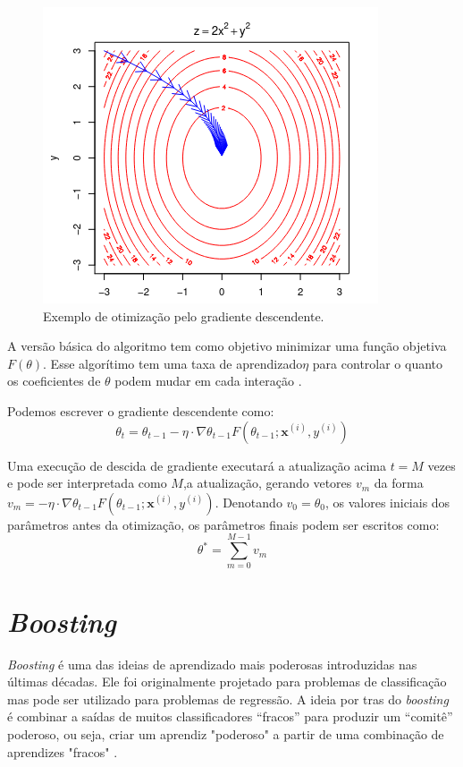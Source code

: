 \begin{figure}[h]
 \caption{Exemplo de otimização pelo gradiente descendente.}
 \label{fig:ex:grad}
 \centering
 \includegraphics[scale=0.4]{images/ilustra_grad.png}
\end{figure}

A versão básica do algoritmo tem como objetivo minimizar uma função objetiva $F(\theta)$. Esse algorítimo tem uma taxa de aprendizado$\eta$ para controlar o quanto os coeficientes de $\theta$ podem mudar em cada interação \cite{russel,hastie,ian,over:gradia,mit:parallel,convex:opt}. 

Podemos escrever o gradiente descendente como:
\begin{equation} \label{eq:gradiente}
    \theta_t = \theta_{t-1} - \eta \cdot \nabla{\theta_{t-1}}F(\theta_{t-1};\mathbf{x}^{(i)},y^{(i)})
\end{equation}

Uma execução de descida de gradiente executará a atualização acima $t = M$ vezes e pode ser interpretada como $M$,a atualização, gerando vetores $v_m$ da forma $v_m = - \eta \cdot \nabla{\theta_{t-1}}F(\theta_{t-1};\mathbf{x}^{(i)},y^{(i)})$. Denotando $v_0 = \theta_0$, os valores iniciais dos parâmetros antes da otimização, os parâmetros finais podem ser escritos como:
\begin{equation}
    \theta^* = \sum_{m=0}^{M-1}v_m
\end{equation}



\section{\textit{Boosting}}
\textit{Boosting} é uma das ideias de aprendizado mais poderosas introduzidas nas últimas décadas. Ele foi originalmente projetado para problemas de classificação mas pode ser utilizado para problemas de regressão.  A ideia por tras do \textit{boosting} é combinar a saídas de muitos classificadores “fracos” para produzir um “comitê” poderoso, ou seja, criar um aprendiz "poderoso" a partir de uma combinação de aprendizes "fracos" \cite{brief:intro:boost,hastie}.

